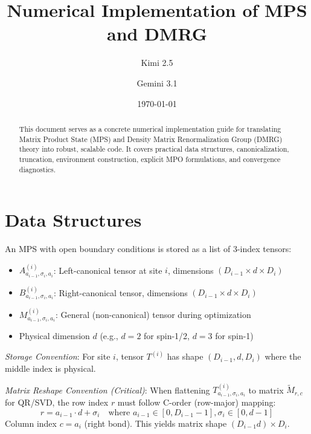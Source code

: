 \documentclass[aps,prb,onecolumn,scriptaddress]{revtex4-2}
\begin{document}
	
	\title{Numerical Implementation of MPS and DMRG}
	\author{Kimi 2.5}
	\author{Gemini 3.1}
	\date{\today}
	
	\begin{abstract}
		This document serves as a concrete numerical implementation guide for translating Matrix Product State (MPS) and Density Matrix Renormalization Group (DMRG) theory into robust, scalable code. It covers practical data structures, canonicalization, truncation, environment construction, explicit MPO formulations, and convergence diagnostics.
	\end{abstract}
	
	\maketitle
	
	\section{Data Structures}
	
	An MPS with open boundary conditions is stored as a list of 3-index tensors:
	\begin{itemize}
		\item $A^{(i)}_{a_{i-1},\sigma_i,a_i}$: Left-canonical tensor at site $i$, dimensions $(D_{i-1} \times d \times D_i)$
		\item $B^{(i)}_{a_{i-1},\sigma_i,a_i}$: Right-canonical tensor, dimensions $(D_{i-1} \times d \times D_i)$  
		\item $M^{(i)}_{a_{i-1},\sigma_i,a_i}$: General (non-canonical) tensor during optimization
		\item Physical dimension $d$ (e.g., $d=2$ for spin-1/2, $d=3$ for spin-1)
	\end{itemize}
	
	\textit{Storage Convention}: For site $i$, tensor $T^{(i)}$ has shape $(D_{i-1}, d, D_i)$ where the middle index is physical.
	
	\textit{Matrix Reshape Convention (Critical)}: When flattening $T^{(i)}_{a_{i-1},\sigma_i,a_i}$ to matrix $\tilde{M}_{r,c}$ for QR/SVD, the row index $r$ must follow C-order (row-major) mapping:
	\begin{equation}
		r = a_{i-1} \cdot d + \sigma_i \quad \text{where } a_{i-1} \in [0,D_{i-1}-1], \sigma_i \in [0,d-1]
	\end{equation}
	Column index $c = a_i$ (right bond). This yields matrix shape $(D_{i-1}d) \times D_i$.
	
\end{document}
